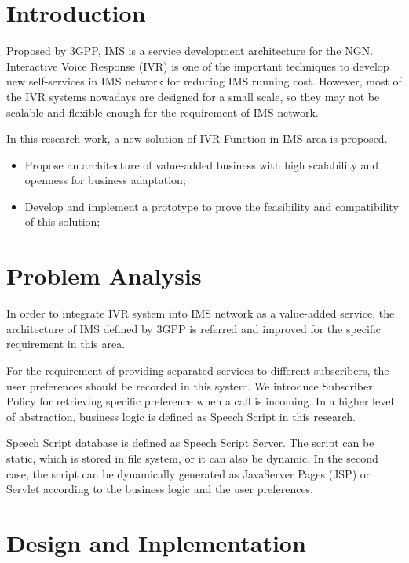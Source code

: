 \documentclass[a0,landscape]{a0poster}
\begin{document}
\begin{multicols}{4}

\color{SaddleBrown}

\section{Introduction}

\Large Proposed by 3GPP, IMS is a service development architecture for the NGN. Interactive Voice Response (IVR) is one of the important techniques to develop new self-services in IMS network for reducing IMS running cost. However, most of the IVR systems nowadays are designed for a small scale, so they may not be scalable and flexible enough for the requirement of IMS network. 

In this research work, a new solution of IVR Function in IMS area is proposed.
\begin{itemize}
\item Propose an architecture of value-added business with high scalability and openness for business adaptation;
\item Develop and implement a prototype to prove the feasibility and compatibility of this solution;
\end{itemize}

\color{DarkSlateGray}

\section{Problem Analysis}

In order to integrate IVR system into IMS network as a value-added service, the architecture of IMS defined by 3GPP is referred and improved for the specific requirement in this area. 

For the requirement of providing separated services to different subscribers, the user preferences should be recorded in this system. We introduce Subscriber Policy for retrieving specific preference when a call is incoming. In a higher level of abstraction, business logic is defined as Speech Script in this research.

Speech Script database is defined as Speech Script Server. The script can be static, which is stored in file system, or it can also be dynamic. In the second case, the script can be dynamically generated as JavaServer Pages (JSP) or Servlet according to the business logic and the user preferences.

\section{Design and Inplementation}


\end{multicols}
\end{document}
